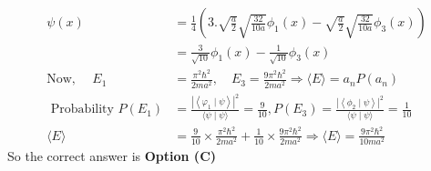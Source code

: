 \begin{enumerate}
\begin{answer}
\begin{align*}
\psi(x)&=\frac{1}{4}\left(3 . \sqrt{\frac{a}{2}} \sqrt{\frac{32}{10 a}} \phi_{1}(x)-\sqrt{\frac{a}{2}} \sqrt{\frac{32}{10 a}} \phi_{3}(x)\right)\\&=\frac{3}{\sqrt{10}} \phi_{1}(x)-\frac{1}{\sqrt{10}} \phi_{3}(x)\\
\text{Now, }\quad E_{1}&=\frac{\pi^{2} \hbar^{2}}{2 m a^{2}}, \quad E_{3}=\frac{9 \pi^{2} \hbar^{2}}{2 m a^{2}} \Rightarrow\langle E\rangle=a_{n} P\left(a_{n}\right)\\
\text{	Probability }P\left(E_{1}\right)&=\frac{\left|\left\langle\varphi_{1} \mid \psi\right\rangle\right|^{2}}{\langle\psi \mid \psi\rangle}=\frac{9}{10}, P\left(E_{3}\right)=\frac{\left|\left\langle\phi_{2} \mid \psi\right\rangle\right|^{2}}{\langle\psi \mid \psi\rangle}=\frac{1}{10}\\
\langle E\rangle&=\frac{9}{10} \times \frac{\pi^{2} \hbar^{2}}{2 m a^{2}}+\frac{1}{10} \times \frac{9 \pi^{2} \hbar^{2}}{2 m a^{2}} \Rightarrow\langle E\rangle=\frac{9 \pi^{2} \hbar^{2}}{10 m a^{2}}
\end{align*}
So the correct answer is \textbf{Option (C)}
\end{answer}
	
	
	
	
	
\end{enumerate}